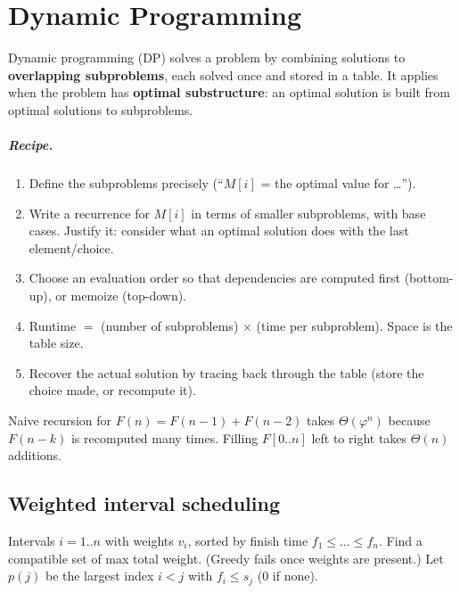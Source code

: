 \chapter{Dynamic Programming}

\begin{important}[Paradigm]
Dynamic programming (DP) solves a problem by combining solutions to \textbf{overlapping subproblems},
each solved once and stored in a table. It applies when the problem has \textbf{optimal substructure}:
an optimal solution is built from optimal solutions to subproblems.
\end{important}

\paragraph{Recipe.}
\begin{enumerate}
  \item Define the subproblems precisely (``$M[i]$ = the optimal value for \dots'').
  \item Write a recurrence for $M[i]$ in terms of smaller subproblems, with base cases. Justify it: consider what an
        optimal solution does with the last element/choice.
  \item Choose an evaluation order so that dependencies are computed first (bottom-up), or memoize (top-down).
  \item Runtime $=$ (number of subproblems) $\times$ (time per subproblem). Space is the table size.
  \item Recover the actual solution by tracing back through the table (store the choice made, or recompute it).
\end{enumerate}

\begin{example}
Naive recursion for $F(n)=F(n-1)+F(n-2)$ takes $\Theta(\varphi^n)$ because $F(n-k)$ is recomputed many times.
Filling $F[0..n]$ left to right takes $\Theta(n)$ additions.
\end{example}

\section{Weighted interval scheduling}
Intervals $i=1..n$ with weights $v_i$, sorted by finish time $f_1\le\dots\le f_n$. Find a compatible set of max total weight.
(Greedy fails once weights are present.) Let $p(j)$ be the largest index $i<j$ with $f_i\le s_j$ (0 if none).

